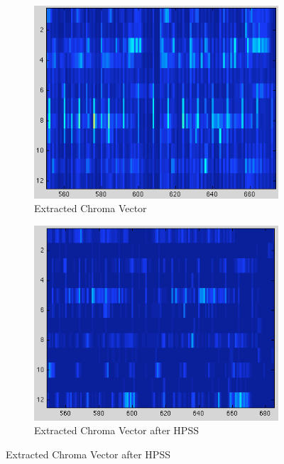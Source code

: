 \documentclass{article}
\begin{document}
\begin{figure}
	\centering
    \begin{subfigure}[b]{0.47\textwidth}
        \includegraphics[width=\textwidth]{187.png}
        \caption{Extracted Chroma Vector}
        \label{fig:ChromaNorm}
    \end{subfigure}
    \begin{subfigure}[b]{0.47\textwidth}
        \includegraphics[width=\textwidth]{187h.png}
        \caption{Extracted Chroma Vector after HPSS}
        \label{fig:ChromaHPSS}
    \end{subfigure}
\end{figure}
\end{document}
